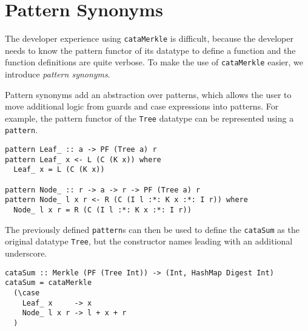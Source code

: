 \section{Pattern Synonyms}
\label{sec-patt-syn}

The developer experience using \texttt{cataMerkle} is difficult, because the developer needs to know the pattern functor of its datatype to define a function and the function definitions are quite verbose. To make the use of \texttt{cataMerkle} easier, we introduce \textit{pattern synonyms}\cite{pickering2016pattern}. 

Pattern synonyms add an abstraction over patterns, which allows the user to move additional logic from guards and case expressions into patterns. For example, the pattern functor of the \texttt{Tree} datatype can be represented using a \texttt{pattern}.

\begin{verbatim}
pattern Leaf_ :: a -> PF (Tree a) r
pattern Leaf_ x <- L (C (K x)) where
  Leaf_ x = L (C (K x))

pattern Node_ :: r -> a -> r -> PF (Tree a) r
pattern Node_ l x r <- R (C (I l :*: K x :*: I r)) where
  Node_ l x r = R (C (I l :*: K x :*: I r))
\end{verbatim}

The previously defined \texttt{pattern}s can then be used to define the \texttt{cataSum} as the original datatype \texttt{Tree}, but the constructor names leading with an additional underscore. 

\begin{verbatim}
cataSum :: Merkle (PF (Tree Int)) -> (Int, HashMap Digest Int)
cataSum = cataMerkle
  (\case
    Leaf_ x     -> x
    Node_ l x r -> l + x + r
  )
\end{verbatim}